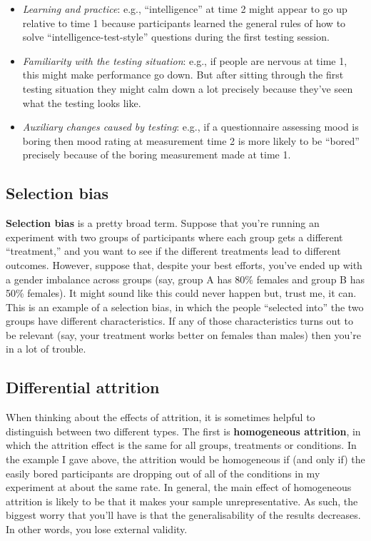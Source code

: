 \documentclass[
]{book}
\providecommand{\tightlist}{%
  \setlength{\itemsep}{0pt}\setlength{\parskip}{0pt}}
\begin{document}
\begin{itemize}
\tightlist
\item
  \emph{Learning and practice}: e.g., ``intelligence'' at time 2 might appear to go up relative to time 1 because participants learned the general rules of how to solve ``intelligence-test-style'' questions during the first testing session.\\
\item
  \emph{Familiarity with the testing situation}: e.g., if people are nervous at time 1, this might make performance go down. But after sitting through the first testing situation they might calm down a lot precisely because they've seen what the testing looks like.
\item
  \emph{Auxiliary changes caused by testing}: e.g., if a questionnaire assessing mood is boring then mood rating at measurement time 2 is more likely to be ``bored'' precisely because of the boring measurement made at time 1.
\end{itemize}

\hypertarget{selection-bias}{%
\subsection{Selection bias}\label{selection-bias}}

{\textbf{Selection bias}} is a pretty broad term. Suppose that you're running an experiment with two groups of participants where each group gets a different ``treatment,'' and you want to see if the different treatments lead to different outcomes. However, suppose that, despite your best efforts, you've ended up with a gender imbalance across groups (say, group A has 80\% females and group B has 50\% females). It might sound like this could never happen but, trust me, it can. This is an example of a selection bias, in which the people ``selected into'' the two groups have different characteristics. If any of those characteristics turns out to be relevant (say, your treatment works better on females than males) then you're in a lot of trouble.

\hypertarget{differentialattrition}{%
\subsection{Differential attrition}\label{differentialattrition}}

When thinking about the effects of attrition, it is sometimes helpful to distinguish between two different types. The first is {\textbf{homogeneous attrition}}, in which the attrition effect is the same for all groups, treatments or conditions. In the example I gave above, the attrition would be homogeneous if (and only if) the easily bored participants are dropping out of all of the conditions in my experiment at about the same rate. In general, the main effect of homogeneous attrition is likely to be that it makes your sample unrepresentative. As such, the biggest worry that you'll have is that the generalisability of the results decreases. In other words, you lose external validity.
\end{document}
